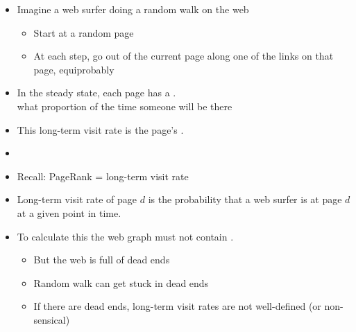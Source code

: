 \documentclass[a4paper,landscape,headrule,footrule,xetex]{foils}
\begin{document}




\begin{itemize}
\item Imagine a web surfer doing a random walk on the web 
\begin{itemize}
\item Start at a random page
\item At each step, go out of the current page along one of
  the links on that page, equiprobably
\end{itemize}
\item In the steady state, each page has a .
  \\ what proportion of the time someone will be there
\item This long-term visit rate is the page's .
\item {}
\end{itemize}




\begin{itemize}
\item Recall: PageRank = long-term visit rate
\item Long-term visit rate of page $d$ is the probability that a web surfer
  is at page $d$ at a given point in time.
\item To calculate this the web graph must not contain
  .
  \begin{itemize}
  \item But the web is full of dead ends
  \item Random walk can get stuck in dead ends
  \item If there are dead ends, long-term visit
    rates are not well-defined (or non-sensical)
  \end{itemize}
  \end{itemize}
\end{document}
